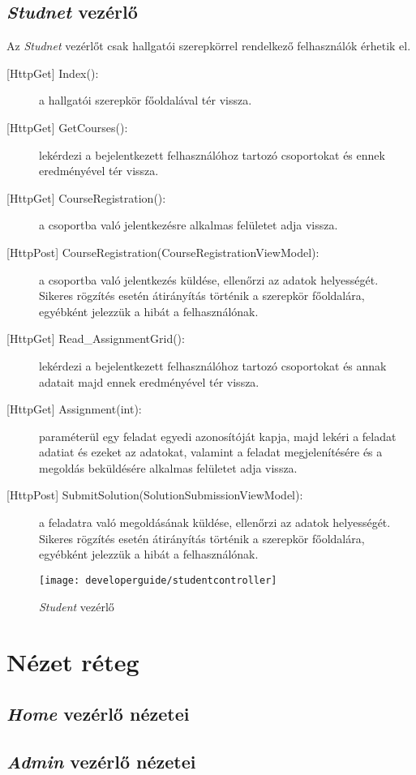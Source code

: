 \subsection{\emph{Studnet} vezérlő}
Az \emph{Studnet} vezérlőt csak hallgatói szerepkörrel rendelkező felhasználók érhetik el.
\begin{description}
	\item[{[HttpGet]} Index():] a hallgatói szerepkör főoldalával tér vissza.
	\item[{[HttpGet]} GetCourses():] lekérdezi a bejelentkezett felhasználóhoz tartozó csoportokat és ennek eredményével tér vissza.
	\item[{[HttpGet]} CourseRegistration():] a csoportba való jelentkezésre alkalmas felületet adja vissza.
	\item[{[HttpPost]} CourseRegistration(CourseRegistrationViewModel):] a csoportba való jelentkezés küldése, ellenőrzi az adatok helyességét. Sikeres rögzítés esetén átirányítás történik a szerepkör főoldalára, egyébként jelezzük a hibát a felhasználónak.
	\item[{[HttpGet]} Read\_AssignmentGrid():] lekérdezi a bejelentkezett felhasználóhoz tartozó csoportokat és annak adatait majd ennek eredményével tér vissza.
	\item[{[HttpGet]} Assignment(int):] paraméterül egy feladat egyedi azonosítóját kapja, majd lekéri a feladat adatiat és ezeket az adatokat, valamint a feladat megjelenítésére és a megoldás beküldésére alkalmas felületet adja vissza.
	\item[{[HttpPost]} SubmitSolution(SolutionSubmissionViewModel):] a feladatra való megoldásának küldése, ellenőrzi az adatok helyességét. Sikeres rögzítés esetén átirányítás történik a szerepkör főoldalára, egyébként jelezzük a hibát a felhasználónak.
\end{description}
\begin{figure}[H]
	\centering
	\texttt{[image: developerguide/studentcontroller]}
	\caption{\emph{Student} vezérlő}
	\label{fig:studentcontroller}
\end{figure}
\section{Nézet réteg}
\label{sec:view}
\subsection{\emph{Home} vezérlő nézetei}
\subsection{\emph{Admin} vezérlő nézetei}
